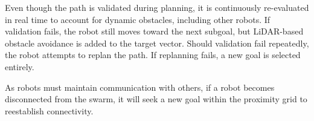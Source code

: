 Even though the path is validated during planning, it is continuously re-evaluated in real time to account for dynamic obstacles, including other robots.
If validation fails, the robot still moves toward the next subgoal, but LiDAR-based obstacle avoidance is added to the target vector.
Should validation fail repeatedly, the robot attempts to replan the path. If replanning fails, a new goal is selected entirely.

As robots must maintain communication with others, if a robot becomes disconnected from the swarm, it will seek a new goal within the proximity grid to reestablish connectivity.
